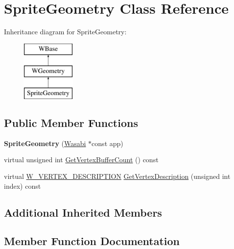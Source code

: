 \hypertarget{class_sprite_geometry}{}\section{Sprite\+Geometry Class Reference}
\label{class_sprite_geometry}
Inheritance diagram for Sprite\+Geometry\+:\begin{figure}[H]
\begin{center}
\leavevmode
\includegraphics[height=3.000000cm]{class_sprite_geometry}
\end{center}
\end{figure}
\subsection*{Public Member Functions}
\begin{DoxyCompactItemize}
\item 
{\bfseries Sprite\+Geometry} (\hyperlink{class_wasabi}{Wasabi} $\ast$const app)\hypertarget{class_sprite_geometry_a597eab0671bcd1e06f2a30d13298d303}{}\label{class_sprite_geometry_a597eab0671bcd1e06f2a30d13298d303}

\item 
virtual unsigned int \hyperlink{class_sprite_geometry_a3c2a4c34292f6643f4bc7f375fe7ae68}{Get\+Vertex\+Buffer\+Count} () const 
\item 
virtual \hyperlink{struct_w___v_e_r_t_e_x___d_e_s_c_r_i_p_t_i_o_n}{W\+\_\+\+V\+E\+R\+T\+E\+X\+\_\+\+D\+E\+S\+C\+R\+I\+P\+T\+I\+ON} \hyperlink{class_sprite_geometry_a84172139912969ed1d36f48506f5918a}{Get\+Vertex\+Description} (unsigned int index) const 
\end{DoxyCompactItemize}
\subsection*{Additional Inherited Members}


\subsection{Member Function Documentation}
